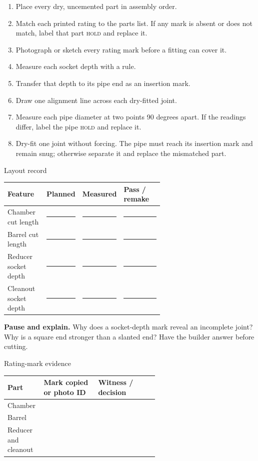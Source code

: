 \begin{enumerate}
\item Place every dry, uncemented part in assembly order.
\item Match each printed rating to the parts list. If any mark is absent or
does not match, label that part \textsc{hold} and replace it.
\item Photograph or sketch every rating mark before a fitting can cover it.
\item Measure each socket depth with a rule.
\item Transfer that depth to its pipe end as an insertion mark.
\item Draw one alignment line across each dry-fitted joint.
\item Measure each pipe diameter at two points 90 degrees apart. If the
readings differ, label the pipe \textsc{hold} and replace it.
\item Dry-fit one joint without forcing. The pipe must reach its insertion
mark and remain snug; otherwise separate it and replace the mismatched part.
\end{enumerate}

\begin{teloscard}{Layout record}
\begin{tabularx}{\linewidth}{@{}p{0.25\linewidth}p{0.17\linewidth}p{0.20\linewidth}L@{}}
\toprule
\textbf{Feature} & \textbf{Planned} & \textbf{Measured} & \textbf{Pass / remake}\\
\midrule
Chamber cut length & \rule{0.55in}{0.4pt} & \rule{0.55in}{0.4pt} & \rule{0.85in}{0.4pt}\\
Barrel cut length & \rule{0.55in}{0.4pt} & \rule{0.55in}{0.4pt} & \rule{0.85in}{0.4pt}\\
Reducer socket depth & \rule{0.55in}{0.4pt} & \rule{0.55in}{0.4pt} & \rule{0.85in}{0.4pt}\\
Cleanout socket depth & \rule{0.55in}{0.4pt} & \rule{0.55in}{0.4pt} & \rule{0.85in}{0.4pt}\\
\bottomrule
\end{tabularx}
\end{teloscard}

\begin{telosframe}
\textbf{Pause and explain.} Why does a socket-depth mark reveal an incomplete
joint? Why is a square end stronger than a slanted end? Have the builder answer
before cutting. 
\end{telosframe}

\begin{teloscard}{Rating-mark evidence}
\begin{tabularx}{\linewidth}{@{}p{0.24\linewidth}p{0.36\linewidth}L@{}}
\toprule
\textbf{Part} & \textbf{Mark copied or photo ID} & \textbf{Witness / decision}\\
\midrule
Chamber & \rule{0pt}{1.7em} & \\
Barrel & \rule{0pt}{1.7em} & \\
Reducer and cleanout & \rule{0pt}{1.7em} & \\
\bottomrule
\end{tabularx}
\end{teloscard}

